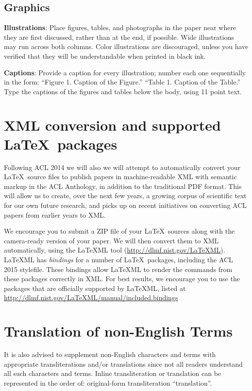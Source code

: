 \documentclass[9pt]{article}
\begin{document}
\subsection{Graphics}

{\bf Illustrations}: Place figures, tables, and photographs in the
paper near where they are first discussed, rather than at the end, if
possible.  Wide illustrations may run across both columns.  Color
illustrations are discouraged, unless you have verified that  
they will be understandable when printed in black ink.

{\bf Captions}: Provide a caption for every illustration; number each one
sequentially in the form:  ``Figure 1. Caption of the Figure.'' ``Table 1.
Caption of the Table.''  Type the captions of the figures and 
tables below the body, using 11 point text.


\section{XML conversion and supported \LaTeX\ packages}

Following ACL 2014 we will also we will attempt to automatically convert 
your \LaTeX\ source files to publish papers in machine-readable 
XML with semantic markup in the ACL Anthology, in addition to the 
traditional PDF format.  This will allow us to create, over the next 
few years, a growing corpus of scientific text for our own future research, 
and picks up on recent initiatives on converting ACL papers from earlier 
years to XML. 

We encourage you to submit a ZIP file of your \LaTeX\ sources along
with the camera-ready version of your paper. We will then convert them
to XML automatically, using the LaTeXML tool
(\url{http://dlmf.nist.gov/LaTeXML}). LaTeXML has \emph{bindings} for
a number of \LaTeX\ packages, including the ACL 2015 stylefile. These
bindings allow LaTeXML to render the commands from these packages
correctly in XML. For best results, we encourage you to use the
packages that are officially supported by LaTeXML, listed at
\url{http://dlmf.nist.gov/LaTeXML/manual/included.bindings}





\section{Translation of non-English Terms}

It is also advised to supplement non-English characters and terms
with appropriate transliterations and/or translations
since not all readers understand all such characters and terms.
Inline transliteration or translation can be represented in
the order of: original-form transliteration ``translation''.
\end{document}
